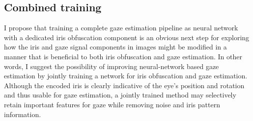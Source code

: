 \subsection{Combined training}
I propose that training a complete gaze estimation pipeline as neural network with a dedicated iris obfuscation component is an obvious next step for exploring how the iris and gaze signal components in images might be modified in a manner that is beneficial to both iris obfuscation and gaze estimation. In other words, I suggest the possibility of improving neural-network based gaze estimation by jointly training a network for iris obfuscation and gaze estimation. Although the encoded iris is clearly indicative of the eye's position and rotation and thus usable for gaze estimation, a jointly trained method may selectively retain important features for gaze while removing noise and iris pattern information.





